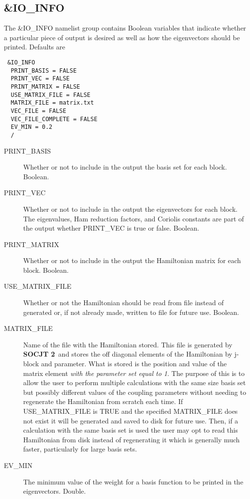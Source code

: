\documentclass{article}
\newcommand{\socjttwo}{{\bf SOCJT 2}}
\begin{document}
\subsection{\&IO\_INFO}

The \&IO\_INFO namelist group contains Boolean variables that
indicate whether a particular piece of output is desired as well
as how the eigenvectors should be printed. Defaults are

\begin{verbatim}
 &IO_INFO
  PRINT_BASIS = FALSE
  PRINT_VEC = FALSE
  PRINT_MATRIX = FALSE
  USE_MATRIX_FILE = FALSE
  MATRIX_FILE = matrix.txt
  VEC_FILE = FALSE
  VEC_FILE_COMPLETE = FALSE
  EV_MIN = 0.2
  /
\end{verbatim}

\begin{description}

\item[PRINT\_BASIS] Whether or not to include in the output the basis
  set for each block. Boolean.

\item[PRINT\_VEC] Whether or not to include in the output the eigenvectors
  for each block. The eigenvalues, Ham reduction factors, and Coriolis
  constants are part of the output whether PRINT\_VEC is true or
  false. Boolean.

\item[PRINT\_MATRIX] Whether or not to include in the output the Hamiltonian
  matrix for each block. Boolean.
  
  \item[USE\_MATRIX\_FILE] Whether or not the Hamiltonian should be read from file instead of generated or, if not already made, written to file for future use. Boolean.
  
  \item[MATRIX\_FILE] Name of the file with the Hamiltonian stored. This file is generated by \socjttwo\ and stores the off diagonal elements of the Hamiltonian by j-block and parameter. What is stored is the position and value of the matrix element \emph{with the parameter set equal to 1}. The purpose of this is to allow the user to perform multiple calculations with the same size basis set but possibly different values of the coupling parameters without needing to regenerate the Hamiltonian from scratch each time. If USE\_MATRIX\_FILE is TRUE and the specified MATRIX\_FILE does not exist it will be generated and saved to disk for future use. Then, if a calculation with the same basis set is used the user may opt to read this Hamiltonian from disk instead of regenerating it which is generally much faster, particularly for large basis sets. 
  
\item[EV\_MIN] The minimum value of the weight for a basis function to be 
  printed in the eigenvectors. Double.

\end{description}
\end{document}
